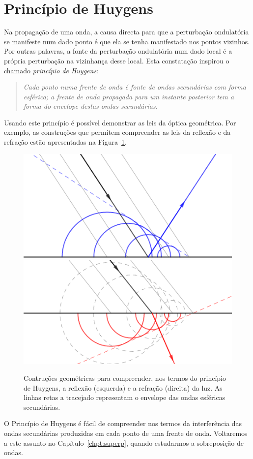 \section{Princípio de Huygens}
Na propagação de uma onda, a causa directa para que a perturbação ondulatória se
manifeste num dado ponto é que ela se tenha manifestado nos pontos vizinhos. Por
outras palavras, a fonte da perturbação ondulatória num dado local é a própria
perturbação na vizinhança desse local. Esta constatação inspirou o chamado
\emph{princípio de Huygens}:
\begin{quote}
    \textsl{Cada ponto numa frente de onda é fonte de ondas secundárias com
    forma esférica; a frente de onda propagada para um instante posterior tem a
    forma do envelope destas ondas secundárias.}
\end{quote}
Usando este princípio é possível demonstrar as leis da óptica geométrica. Por
exemplo, as construções que permitem compreender as leis da reflexão e da
refração estão apresentadas na Figura~\ref{fig:f060}.
\begin{figure}[htb]
\begin{center}
\includegraphics[width=0.45\linewidth]{figs/huygens_reflection.png}\hfill
\includegraphics[width=0.45\linewidth]{figs/huygens_refraction.png}
\end{center}
\caption{Contruções geométricas para compreender, nos termos do princípio de
Huygens, a reflexão (esquerda) e a refração (direita) da luz. As linhas retas a
tracejado representam o envelope das ondas esféricas
secundárias.\label{fig:f060}}
\end{figure}

O Princípio de Huygens é fácil de compreender nos termos da interferência das
ondas secundárias produzidas em cada ponto de uma frente de onda. Voltaremos a
este assunto no Capítulo~\ref{chpt:superp}, quando estudarmos a sobreposição de
ondas.


